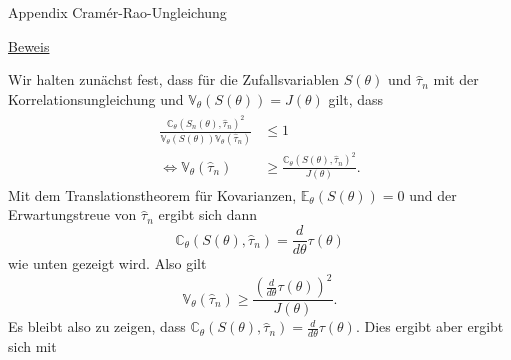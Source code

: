\documentclass[
  8pt,
  ignorenonframetext,
]{beamer}
\begin{document}
\begin{frame}{Appendix \textbar{} Cramér-Rao-Ungleichung}
\protect\hypertarget{appendix-cramuxe9r-rao-ungleichung-18}{}
\footnotesize

\underline{Beweis} \vspace{.1cm}

Wir halten zunächst fest, dass für die Zufallsvariablen \(S(\theta)\)
und \(\hat{\tau}_n\) mit der Korrelationsungleichung und
\(\mathbb{V}_\theta(S(\theta)) = J(\theta)\) gilt, dass \begin{align}
\begin{split}
\frac{\mathbb{C}_\theta(S_n(\theta), \hat{\tau}_n)^2}{\mathbb{V}_\theta(S(\theta))\mathbb{V}_\theta(\hat{\tau}_n)}
& \le 1 \\
\Leftrightarrow \mathbb{V}_\theta(\hat{\tau}_n)
& \ge \frac{\mathbb{C}_\theta(S(\theta),\hat{\tau}_n)^2}{J(\theta)}.
\end{split}
\end{align} Mit dem Translationstheorem für Kovarianzen,
\(\mathbb{E}_\theta(S(\theta))= 0\) und der Erwartungstreue von
\(\hat{\tau}_n\) ergibt sich dann \begin{equation}
\mathbb{C}_\theta(S(\theta),\hat{\tau}_n) = \frac{d}{d\theta}\tau(\theta)
\end{equation} wie unten gezeigt wird. Also gilt \begin{equation}
\mathbb{V}_\theta(\hat{\tau}_n) \ge \frac{\left(\frac{d}{d\theta}\tau(\theta) \right)^2}{J(\theta)}.
\end{equation} Es bleibt also zu zeigen, dass
\(\mathbb{C}_\theta(S(\theta),\hat{\tau}_n) = \frac{d}{d\theta}\tau(\theta)\).
Dies ergibt aber ergibt sich mit
\end{frame}
\end{document}
